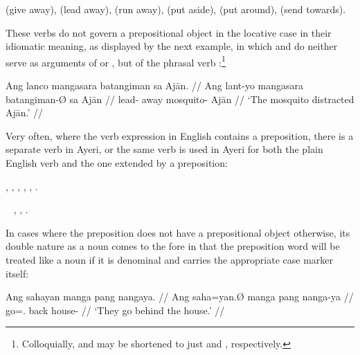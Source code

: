 \pex
\a {} (give away),
\a {} (lead away),
\a {} (run away),
\a {} (put aside),
\a {} (put around),
\a {} (send towards).
\xe

These verbs do not govern a prepositional object in the locative case in their 
idiomatic meaning, as displayed by the next example, in which 
 and  do neither serve as 
arguments of  or , but of the phrasal 
verb :\footnote{Colloquially, 
 and  may be shortened to just 
 and , respectively.}

\ex\begingl
	\gla Ang lanco mangasara batangiman sa Ajān. //
	\glb Ang lant-yo mangasara batangiman-Ø sa Ajān //
	\glc \AgtT{} lead-\TsgN{} away mosquito-\Top{} \Parg{} Ajān //
	\glft `The mosquito distracted Ajān.' //
\endgl\xe

Very often, where the verb expression in English contains a preposition, there 
is a separate verb in Ayeri, or the same verb is used in Ayeri for both the 
plain English verb and the one extended by a preposition:

\pex
	\a {},
	\a {},
	\a {},
	\a {},
	\a {},
	\a {}.
\xe

\pex~
	\a {},
	\a {},
	\a {}.
\xe

In cases where the preposition does not have a prepositional object otherwise, 
its double nature as a noun comes to the fore in that the preposition word will 
be treated like a noun if it is denominal and carries the appropriate case 
marker itself:

\pex
\a\begingl
	\gla Ang sahayan manga pang nangaya. //
	\glb Ang saha=yan.Ø manga pang nanga-ya //
	\glc \AgtT{} go=\Tpl{}.\Top{} \Dyn{} back house-\Loc{} //
	\glft `They go behind the house.' //
\endgl

